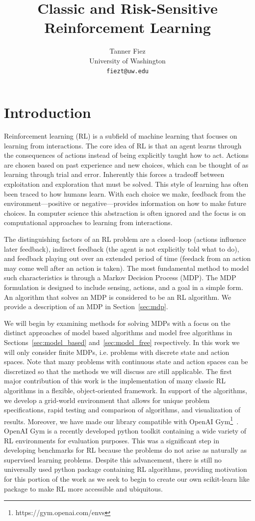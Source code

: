 \documentclass{article}
\title{Classic and Risk-Sensitive Reinforcement Learning}
\author{
  Tanner Fiez \\
  University of Washington \\
  \texttt{fiezt@uw.edu} \\
}
\begin{document}
\maketitle
\section{Introduction}
Reinforcement learning (RL) is a subfield of machine learning that focuses on learning from interactions. The core idea of RL is that an agent learns through the consequences of actions instead of being explicitly taught how to act. Actions are chosen based on past experience and new choices, which can be thought of as learning through trial and error. Inherently this forces a tradeoff between exploitation and exploration that must be solved. This style of learning has often been traced to how humans learn. With each choice we make, feedback from the environment---positive or negative---provides information on how to make future choices. In computer science this abstraction is often ignored and the focus is on computational approaches to learning from interactions. 

The distinguishing factors of an RL problem are a closed--loop (actions influence later feedback), indirect feedback (the agent is not explicitly told what to do), and feedback playing out over an extended period of time (feedack from an action may come well after an action is taken). The most fundamental method to model such characteristics is through a Markov Decision Process (MDP). The MDP formulation is designed to include sensing, actions, and a goal in a simple form. An algorithm that solves an MDP is considered to be an RL algorithm. We provide a description of an MDP in Section~\ref{sec:mdp}.

We will begin by examining methods for solving MDPs with a focus on the distinct approaches of model based algorithms and model free algorithms in Sections~\ref{sec:model_based} and~\ref{sec:model_free} respectively. In this work we will only consider finite MDPs, i.e. problems with discrete state and action spaces. Note that many problems with continuous state and action spaces can be discretized so that the methods we will discuss are still applicable. The first major contribution of this work is the implementation of many classic RL algorithms in a flexible, object-oriented framework. In support of the algorithms, we develop a grid-world environment that allows for unique problem specifications, rapid testing and comparison of algorithms, and visualization of results. Moreover, we have made our library compatible with OpenAI Gym\footnote{https://gym.openai.com/envs}~\cite{DBLP:journals/corr/BrockmanCPSSTZ16}. OpenAI Gym is a recently developed python toolkit containing a wide variety of RL environments for evaluation purposes. This was a significant step in developing benchmarks for RL because the problems do not arise as naturally as supervised learning problems. Despite this advancement, there is still no universally used python package containing RL algorithms, providing motivation for this portion of the work as we seek to begin to create our own scikit-learn like package to make RL more accessible and ubiquitous.
\end{document}
